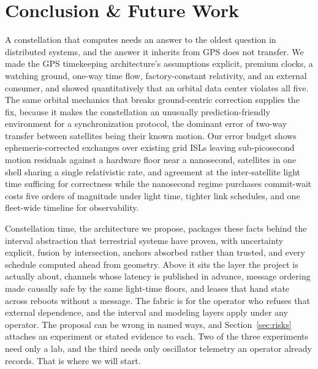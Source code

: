 \documentclass[twocolumn,10pt]{article}
\begin{document}
\section{Conclusion \& Future Work}\label{sec:conclusion}
A constellation that computes needs an answer to the oldest question in distributed systems, and the answer it inherits from GPS does not transfer. We made the GPS timekeeping architecture's assumptions explicit, premium clocks, a watching ground, one-way time flow, factory-constant relativity, and an external consumer, and showed quantitatively that an orbital data center violates all five. The same orbital mechanics that breaks ground-centric correction supplies the fix, because it makes the constellation an unusually prediction-friendly environment for a synchronization protocol, the dominant error of two-way transfer between satellites being their known motion. Our error budget shows ephemeris-corrected exchanges over existing grid ISLs leaving sub-picosecond motion residuals against a hardware floor near a nanosecond, satellites in one shell sharing a single relativistic rate, and agreement at the inter-satellite light time sufficing for correctness while the nanosecond regime purchases commit-wait costs five orders of magnitude under light time, tighter link schedules, and one fleet-wide timeline for observability.

Constellation time, the architecture we propose, packages these facts behind the interval abstraction that terrestrial systems have proven, with uncertainty explicit, fusion by intersection, anchors absorbed rather than trusted, and every schedule computed ahead from geometry. Above it sits the layer the project is actually about, channels whose latency is published in advance, message ordering made causally safe by the same light-time floors, and leases that hand state across reboots without a message. The fabric is for the operator who refuses that external dependence, and the interval and modeling layers apply under any operator. The proposal can be wrong in named ways, and Section~\ref{sec:risks} attaches an experiment or stated evidence to each. Two of the three experiments need only a lab, and the third needs only oscillator telemetry an operator already records. That is where we will start.
\end{document}
